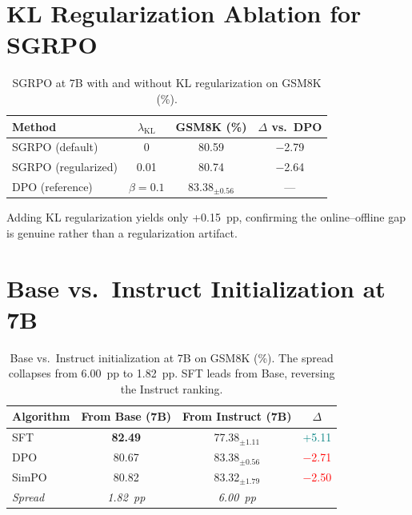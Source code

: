 \documentclass{article}
\begin{document}
\section{KL Regularization Ablation for SGRPO}
\label{app:kl_ablation}

\begin{table}[ht]
\centering
\caption{SGRPO at 7B with and without KL regularization on GSM8K (\%).}
\label{tab:kl_ablation}
\small
\begin{tabular}{@{}lccc@{}}
\toprule
\textbf{Method} & $\lambda_{\text{KL}}$ & \textbf{GSM8K (\%)} & \textbf{$\Delta$ vs.\ DPO} \\
\midrule
SGRPO (default) & 0 & 80.59 & $-$2.79 \\
SGRPO (regularized) & 0.01 & 80.74 & $-$2.64 \\
\midrule
DPO (reference) & $\beta = 0.1$ & 83.38$_{\pm 0.56}$ & --- \\
\bottomrule
\end{tabular}
\end{table}

Adding KL regularization yields only +0.15~pp, confirming the online--offline gap is genuine rather than a regularization artifact.

\section{Base vs.\ Instruct Initialization at 7B}
\label{app:base_7b_ablation}

\begin{table}[ht]
\centering
\caption{Base vs.\ Instruct initialization at 7B on GSM8K (\%). The spread collapses from 6.00~pp to 1.82~pp. SFT leads from Base, reversing the Instruct ranking.}
\label{tab:base_7b_ablation}
\small
\begin{tabular}{@{}lccc@{}}
\toprule
\textbf{Algorithm} & \textbf{From Base (7B)} & \textbf{From Instruct (7B)} & \textbf{$\Delta$} \\
\midrule
SFT & \textbf{82.49} & 77.38$_{\pm 1.11}$ & \textcolor{teal}{+5.11} \\
DPO & 80.67 & 83.38$_{\pm 0.56}$ & \textcolor{red}{$-$2.71} \\
SimPO & 80.82 & 83.32$_{\pm 1.79}$ & \textcolor{red}{$-$2.50} \\
\midrule
\textit{Spread} & \textit{1.82~pp} & \textit{6.00~pp} & \\
\bottomrule
\end{tabular}
\end{table}
\end{document}
